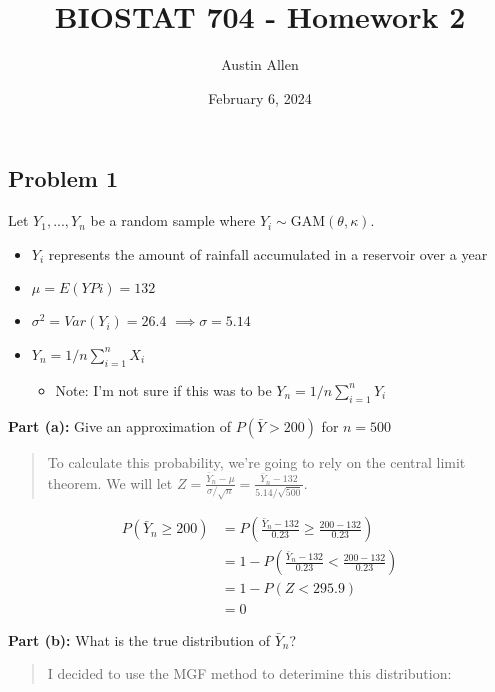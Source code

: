 \documentclass[
]{article}
\title{BIOSTAT 704 - Homework 2}
\author{Austin Allen}
\date{February 6, 2024}
\providecommand{\tightlist}{%
  \setlength{\itemsep}{0pt}\setlength{\parskip}{0pt}}
\begin{document}
\maketitle

\hypertarget{problem-1}{%
\subsection{Problem 1}\label{problem-1}}

Let \(Y_1,...,Y_n\) be a random sample where
\(Y_i \sim \text{GAM}(\theta, \kappa)\).

\begin{itemize}
\tightlist
\item
  \(Y_i\) represents the amount of rainfall accumulated in a reservoir
  over a year
\item
  \(\mu = E(YPi) = 132\)
\item
  \(\sigma^2 = Var(Y_i) = 26.4\) \(\implies \sigma = 5.14\)
\item
  \(Y_n = 1/n \sum_{i = 1}^{n} X_i\)

  \begin{itemize}
  \tightlist
  \item
    Note: I'm not sure if this was to be
    \(Y_n = 1/n \sum_{i = 1}^{n} Y_i\)
  \end{itemize}
\end{itemize}

\textbf{Part (a):} Give an approximation of \(P(\bar{Y} > 200)\) for
\(n = 500\)

\begin{quote}
To calculate this probability, we're going to rely on the central limit
theorem. We will let
\(Z = \frac{\bar{Y}_n - \mu}{\sigma/\sqrt{n}} = \frac{\bar{Y}_n - 132}{5.14/\sqrt{500}}\).
\end{quote}

\begin{align*}
P(\bar{Y}_n \ge 200) &= P(\frac{\bar{Y}_n - 132}{0.23} \ge \frac{200 - 132}{0.23})\\
&= 1 - P(\frac{\bar{Y}_n - 132}{0.23} < \frac{200 - 132}{0.23})\\
&= 1 - P(Z < 295.9)\\
&= 0
\end{align*}

\textbf{Part (b):} What is the true distribution of \(\bar{Y}_n\)?

\begin{quote}
I decided to use the MGF method to deterimine this distribution:
\end{quote}
\end{document}
